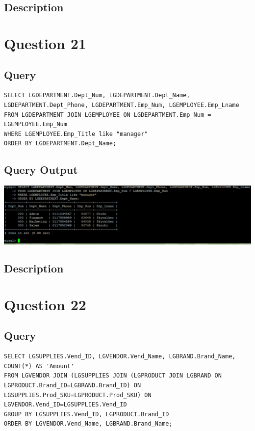 \documentclass[a4paper,10pt]{article}
\begin{document}
\subsection{Description}
\section*{Question 21}
 \subsection{Query}
          \lstset{
            language=SQL,
            breaklines=true
            }
        \begin{lstlisting}[frame=single]
        SELECT LGDEPARTMENT.Dept_Num, LGDEPARTMENT.Dept_Name, LGDEPARTMENT.Dept_Phone, LGDEPARTMENT.Emp_Num, LGEMPLOYEE.Emp_Lname
FROM LGDEPARTMENT JOIN LGEMPLOYEE ON LGDEPARTMENT.Emp_Num = LGEMPLOYEE.Emp_Num
WHERE LGEMPLOYEE.Emp_Title like "manager"
ORDER BY LGDEPARTMENT.Dept_Name;

        \end{lstlisting}
\subsection{Query Output}
           \includegraphics{Queries/Question_21/Question_21_screenshot.PNG}
\subsection{Description}
\section*{Question 22}
 \subsection{Query}
          \lstset{
            language=SQL,
            breaklines=true
            }
        \begin{lstlisting}[frame=single]
        SELECT LGSUPPLIES.Vend_ID, LGVENDOR.Vend_Name, LGBRAND.Brand_Name, COUNT(*) AS 'Amount'
FROM LGVENDOR JOIN (LGSUPPLIES JOIN (LGPRODUCT JOIN LGBRAND ON LGPRODUCT.Brand_ID=LGBRAND.Brand_ID) ON LGSUPPLIES.Prod_SKU=LGPRODUCT.Prod_SKU) ON LGVENDOR.Vend_ID=LGSUPPLIES.Vend_ID
GROUP BY LGSUPPLIES.Vend_ID, LGPRODUCT.Brand_ID
ORDER BY LGVENDOR.Vend_Name, LGBRAND.Brand_Name;
        \end{lstlisting}
\end{document}
